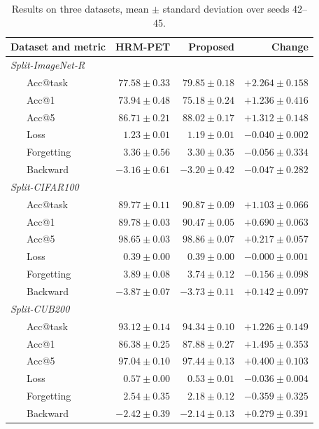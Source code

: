 \documentclass[runningheads]{llncs}
\begin{document}
\begin{table}
\caption{Results on three datasets, mean $\pm$ standard deviation over seeds
42--45.}\label{tab:main}
\begin{tabular}{llrrr}
\hline
\multicolumn{2}{l}{Dataset and metric} & HRM-PET & Proposed & Change\\
\hline
\multicolumn{5}{l}{\emph{Split-ImageNet-R}}\\
& Acc@task   & $77.58 \pm 0.33$ & $79.85 \pm 0.18$ & $+2.264 \pm 0.158$\\
& Acc@1      & $73.94 \pm 0.48$ & $75.18 \pm 0.24$ & $+1.236 \pm 0.416$\\
& Acc@5      & $86.71 \pm 0.21$ & $88.02 \pm 0.17$ & $+1.312 \pm 0.148$\\
& Loss       & $1.23 \pm 0.01$  & $1.19 \pm 0.01$  & $-0.040 \pm 0.002$\\
& Forgetting & $3.36 \pm 0.56$  & $3.30 \pm 0.35$  & $-0.056 \pm 0.334$\\
& Backward   & $-3.16 \pm 0.61$ & $-3.20 \pm 0.42$ & $-0.047 \pm 0.282$\\
\multicolumn{5}{l}{\emph{Split-CIFAR100}}\\
& Acc@task   & $89.77 \pm 0.11$ & $90.87 \pm 0.09$ & $+1.103 \pm 0.066$\\
& Acc@1      & $89.78 \pm 0.03$ & $90.47 \pm 0.05$ & $+0.690 \pm 0.063$\\
& Acc@5      & $98.65 \pm 0.03$ & $98.86 \pm 0.07$ & $+0.217 \pm 0.057$\\
& Loss       & $0.39 \pm 0.00$  & $0.39 \pm 0.00$  & $-0.000 \pm 0.001$\\
& Forgetting & $3.89 \pm 0.08$  & $3.74 \pm 0.12$  & $-0.156 \pm 0.098$\\
& Backward   & $-3.87 \pm 0.07$ & $-3.73 \pm 0.11$ & $+0.142 \pm 0.097$\\
\multicolumn{5}{l}{\emph{Split-CUB200}}\\
& Acc@task   & $93.12 \pm 0.14$ & $94.34 \pm 0.10$ & $+1.226 \pm 0.149$\\
& Acc@1      & $86.38 \pm 0.25$ & $87.88 \pm 0.27$ & $+1.495 \pm 0.353$\\
& Acc@5      & $97.04 \pm 0.10$ & $97.44 \pm 0.13$ & $+0.400 \pm 0.103$\\
& Loss       & $0.57 \pm 0.00$  & $0.53 \pm 0.01$  & $-0.036 \pm 0.004$\\
& Forgetting & $2.54 \pm 0.35$  & $2.18 \pm 0.12$  & $-0.359 \pm 0.325$\\
& Backward   & $-2.42 \pm 0.39$ & $-2.14 \pm 0.13$ & $+0.279 \pm 0.391$\\
\hline
\end{tabular}
\end{table}
\end{document}
